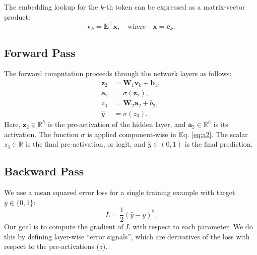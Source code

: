 \documentclass[%
  reprint,
  superscriptaddress,
  showpacs,
  showkeys,
  amsmath,amssymb,
  pra,
  longbibliography,
  floatfix,
  x11names
]{revtex4-2}
\begin{document}
The embedding lookup for the $k$-th token can be expressed as a matrix-vector product:
\begin{equation}
\bm{v}_k = \bm{E}^\intercal \bm{x}, \quad \text{where} \quad \bm{x}=\bm{e}_k.
\end{equation}

\subsection{Forward Pass}
The forward computation proceeds through the network layers as follows:
\begin{align}
\bm{z}_2 &= \bm{W}_1 \bm{v}_k + \bm{b}_1, \label{eq:z2}\\
\bm{a}_2 &= \sigma(\bm{z}_2), \label{eq:a2}\\
z_3 &= \bm{W}_2 \bm{a}_2 + b_2, \label{eq:z3}\\
\hat{y} &= \sigma(z_3). \label{eq:yhat}
\end{align}
Here, $\bm{z}_2 \in \mathbb{R}^h$ is the pre-activation of the hidden layer, and $\bm{a}_2 \in \mathbb{R}^h$ is its activation. The function $\sigma$ is applied component-wise in Eq. \eqref{eq:a2}. The scalar $z_3 \in \mathbb{R}$ is the final pre-activation, or logit, and $\hat{y} \in (0,1)$ is the final prediction.

\subsection{Backward Pass}
We use a mean squared error loss for a single training example with target $y \in \{0, 1\}$:
\begin{equation}
L = \frac{1}{2}(\hat{y}-y)^2.
\end{equation}
Our goal is to compute the gradient of $L$ with respect to each parameter. We do this by defining layer-wise ``error signals'', which are derivatives of the loss with respect to the pre-activations ($z$).
\end{document}
